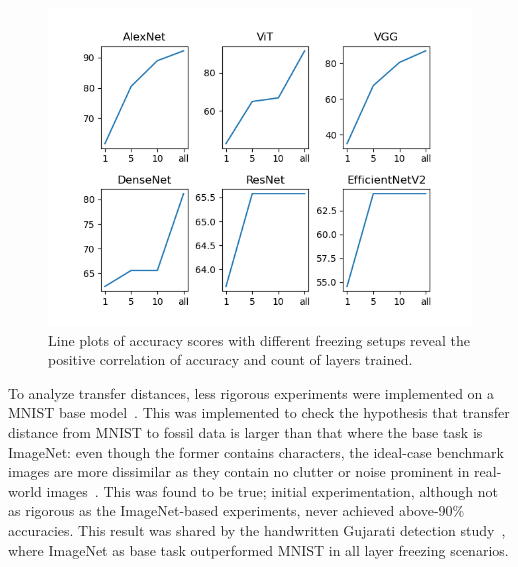 \documentclass[english,twoside,openright]{UH_DS_MSc}
\begin{document}
\begin{figure}[ht]
    \centering
    \includegraphics*[scale=0.8]{images/accuracy_against_freezing.png}
    \caption{Line plots of accuracy scores with different freezing setups reveal the positive correlation of accuracy and count of layers trained.}
    \label{image:accuracy_vs_freezing}
\end{figure}

To analyze transfer distances, less rigorous experiments were implemented on a MNIST base model~\cite{jamilemnist}.
This was implemented to check the hypothesis that transfer distance from MNIST to fossil data is larger than that where 
the base task is ImageNet: even though the former contains characters, the ideal-case benchmark images are more dissimilar 
as they contain no clutter or noise prominent in real-world images~\cite{alexnet}. This was found to be true; 
initial experimentation, although not as rigorous as the ImageNet-based experiments, never achieved above-90\% accuracies.
This result was shared by the handwritten Gujarati detection study~\cite{8goelGujarati2023}, where ImageNet as base task 
outperformed MNIST in all layer freezing scenarios. 
\end{document}
